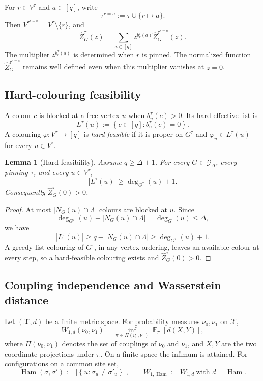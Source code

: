 \documentclass[11pt,reqno]{article}
\theoremstyle{plain}
\newtheorem{lemma}[lemma]{Lemma}
\theoremstyle{definition}
\theoremstyle{remark}
\newcommand{\abs}[1]{\left|#1\right|}
\newcommand{\set}[1]{\left\{#1\right\}}
\DeclareMathOperator{\E}{\mathbb{E}}
\DeclareMathOperator{\Ham}{Ham}
\newcommand{\Deg}{\Delta}                        %
\newcommand{\Wd}{W_{1,d}}                        %
\newcommand{\WHam}{W_{1,\Ham}}                   %
\newcommand{\colours}{[q]}                        %
\newcommand{\bcount}{b}
\newcommand{\Gdeg}{\mathcal{G}_{\Deg}}
\newcommand{\nZpin}[2]{\widehat Z_{#1}^{#2}}
\newcommand{\hardlist}[2]{L^{#1}(#2)}
\begin{document}
For \(r\in V^\tau\) and \(a\in\colours\), write
\[
  \tau^{r=a}:=\tau\cup\{r\mapsto a\}.
\]
Then \(V^{\tau^{r=a}}=V^\tau\setminus\{r\}\), and
\begin{equation}\label{eq:potts-colour-recursion}
  \nZpin{G}{\tau}(z)
  =\sum_{a\in\colours}
     z^{\bcount_r^\tau(a)}\nZpin{G}{\tau^{r=a}}(z).
\end{equation}
The multiplier \(z^{\bcount_r^\tau(a)}\) is determined when \(r\) is pinned.
The normalized function \(\nZpin{G}{\tau^{r=a}}\) remains well defined even
when this multiplier vanishes at \(z=0\).

\subsection{Hard-colouring feasibility}
A colour \(c\) is blocked at a free vertex \(u\) when
\(\bcount_u^\tau(c)>0\).  Its hard effective list is
\[
  \hardlist{\tau}{u}:=\set{c\in\colours:\bcount_u^\tau(c)=0}.
\]
A colouring \(\varphi\colon V^\tau\to\colours\) is \emph{hard-feasible}
if it is proper on \(G^\tau\) and
\(\varphi_u\in\hardlist{\tau}{u}\) for every \(u\in V^\tau\).

\begin{lemma}[Hard feasibility]\label{lem:hard-feas}
Assume \(q\ge\Deg+1\).  For every \(G\in\Gdeg\), every pinning \(\tau\),
and every \(u\in V^\tau\),
\[
  \abs{\hardlist{\tau}{u}}
  \ge \deg_{G^\tau}(u)+1.
\]
Consequently \(\nZpin{G}{\tau}(0)>0\).
\end{lemma}

\begin{proof}
At most \(\abs{N_G(u)\cap\Lambda}\) colours are blocked at \(u\).  Since
\[
  \deg_{G^\tau}(u)+\abs{N_G(u)\cap\Lambda}
  =\deg_G(u)\le\Deg,
\]
we have
\[
  \abs{\hardlist{\tau}{u}}
  \ge q-\abs{N_G(u)\cap\Lambda}
  \ge \deg_{G^\tau}(u)+1.
\]
A greedy list-colouring of \(G^\tau\), in any vertex ordering, leaves an
available colour at every step, so a hard-feasible colouring exists and
\(\nZpin{G}{\tau}(0)>0\).
\end{proof}

\subsection{Coupling independence and Wasserstein distance}

Let $(\mathcal{X},d)$ be a finite metric space. For probability measures
$\nu_0,\nu_1$ on $\mathcal{X}$,
\begin{equation}\label{eq:W1def}
  \Wd(\nu_0,\nu_1) = \inf_{\pi\in\Pi(\nu_0,\nu_1)} \E_{\pi}[d(X,Y)],
\end{equation}
where $\Pi(\nu_0,\nu_1)$ denotes the set of couplings of $\nu_0$ and
$\nu_1$, and \(X,Y\) are the two coordinate projections under \(\pi\).
On a finite space the infimum is attained.
For configurations on a common site set,
\[
  \Ham(\sigma,\sigma')
    :=\abs{\set{u:\sigma_u\ne\sigma'_u}},
  \qquad
  \WHam:=\Wd\ \text{with }d=\Ham.
\]
\end{document}
